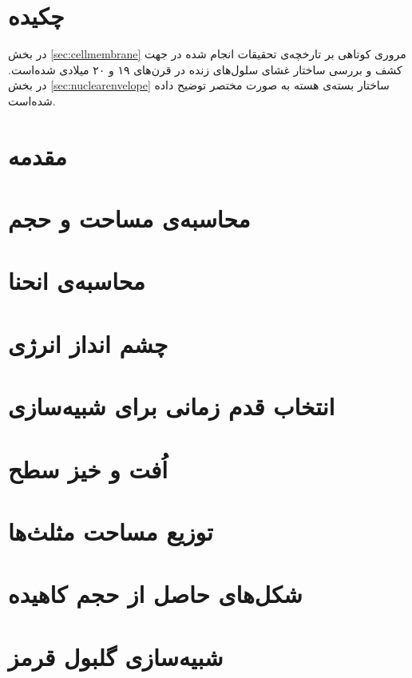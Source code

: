 \setRL
\clearpage
\def \MemRes {\Mempath /MembraneResults}

\section{
چکیده
}
در بخش
\ref{sec:cellmembrane}
مروری کوتاهی بر تارخچه‌ی تحقیقات انجام شده در جهت کشف و بررسی ساختار غشای سلول‌های زنده در قرن‌های ۱۹ و ۲۰ میلادی شده‌است. در بخش
\ref{sec:nuclearenvelope}
ساختار بسته‌ی هسته به صورت مختصر توضیح داده شده‌است.

\section{
مقدمه
}



\section{
محاسبه‌ی مساحت و حجم
}


\section{
محاسبه‌ی انحنا
}


\section{
چشم انداز انرژی
}
%

\section{
انتخاب قدم زمانی برای شبیه‌سازی
}
%


\section{
اُفت و خیز سطح
}
%

\section{
توزیع مساحت مثلث‌ها
}
%


\section{
شکل‌های حاصل از حجم کاهیده
}
%

\section{
شبیه‌سازی گلبول قرمز
}
%




